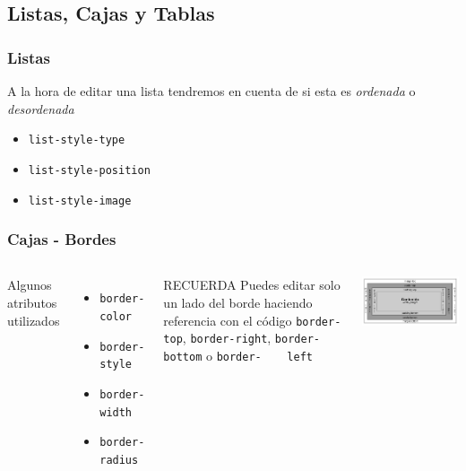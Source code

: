 \documentclass{beamer}
\begin{document}
	\subsection{Listas, Cajas y Tablas}
\begin{frame}[fragile] %
\frametitle{Listas}
	A la hora de editar una lista tendremos en cuenta de si esta es \textit{ordenada} o \textit{desordenada}
	\pause
	\begin{itemize}[<+->]
	\item \verb|list-style-type|
	\item \verb|list-style-position|
	\item \verb|list-style-image|
	\end{itemize}
\end{frame}

\begin{frame}[fragile] %
\frametitle{Cajas - Bordes}
	\begin{columns}[c]
	Algunos atributos utilizados
	\begin{itemize}[<+->]
	\item \verb|border-color|
	\item \verb|border-style|
	\item \verb|border-width|
	\item \verb|border-radius|
	\end{itemize}
	
	\begin{exampleblock}{RECUERDA}
	Puedes editar solo un lado del borde haciendo referencia con el código \verb|border-top|, \verb|border-right|, \verb|border-bottom| o  \verb|border-	left|
	\end{exampleblock}
	\begin{center}
	\includegraphics[scale=.3]{images/ModeloCajas.jpg} 
	\end{center}
	\end{columns}
\end{frame}
\end{document}
